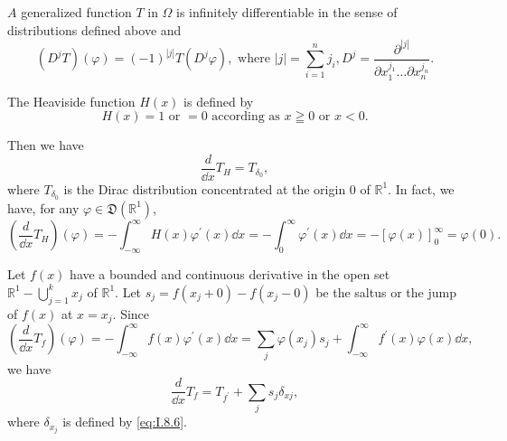 \begin{corollaryu} $A$ generalized function $T$ in $\Omega$ is infinitely differentiable in the sense of distributions defined above and 
\begin{equation}\label{eq:I.8.11}
(D ^{j} T) (\varphi) = (- 1) ^{|j|} T (D ^{j} \varphi), \text{ where } | j | = \sum\limits_{i=1} ^{n} j_{i}, D ^{j} = \frac {\partial^{|j|}}{\partial x_{1} ^ {j_{1}} \dots \partial x_{n} ^ {j_{n}}}.
\end{equation}
\end{corollaryu}

\begin{example}\label{ex:I.8.Example.1a} The Heaviside function $H(x)$ is defined by 
\begin{equation}\label{eq:I.8.12}
H (x) = 1 \text{ or } = 0 \text{ according as } x \geqq 0 \text{ or } x < 0.
\end{equation}
\end{example}

Then we have 
\begin{equation}\tag{12'}\label{eq:I.8.12'}
\frac {d}{\dd x} T_{H} = T_ {\delta_{0}},
\end{equation}
where $T_{\delta_0}$ is the Dirac distribution concentrated at the origin $0$ of $\mathbb{R}^{1}$. In fact, we have, for any $\varphi \in \mathfrak{D}(\mathbb{R}^{1})$, 
\[
\left(\frac {d}{\dd x} T_{H}\right) (\varphi) =- \int_{- \infty} ^{\infty} H (x) \varphi^{\prime} (x) \dd x =- \int_{0} ^{\infty} \varphi^{\prime} (x) \dd x =- [ \varphi (x) ]_{0} ^{\infty} = \varphi (0).
\]

\begin{example}\label{ex:I.8.Example.2a} Let $f(x)$ have a bounded and continuous derivative in the open set $\mathbb{R}^{1}- \bigcup\limits_{j=1}^{k} x_j$ of $\mathbb{R}^{1}$. Let $s_j = f(x_j + 0)- f(x_j- 0)$ be the saltus or the jump of $f(x)$ at $x = x_j$. Since 
\[
\left(\frac {d}{\dd x} T_{f}\right) (\varphi) =- \int_{- \infty} ^{\infty} f (x) \varphi^{\prime} (x) \dd x = \sum\limits_{j} \varphi (x_{j}) s_{j} + \int_{- \infty} ^{\infty} f ^{\prime} (x) \varphi (x) \dd x,
\]
we have 
\begin{equation}\tag{12''}\label{eq:I.8.12a}
\frac {d}{\dd x} T_{f} = T_ {f ^{\prime}} + \sum\limits_{j} s_{j} \delta_{xj},
\end{equation}
where $\delta_{x_{j}}$ is defined by \eqref{eq:I.8.6}. 
\end{example}

